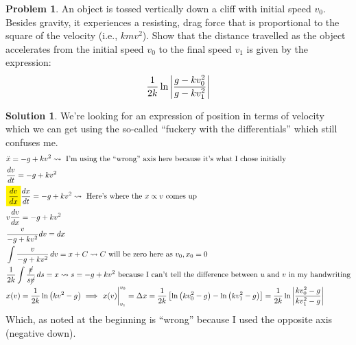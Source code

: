 \documentclass[10pt]{article}
\theoremstyle{definition}
\newtheorem{problem}{Problem}
\newtheorem{soln}{Solution}
\newcommand{\highlight}[1]{\colorbox{yellow}{$\displaystyle #1$}}
\begin{document}
\begin{problem}
An object is tossed vertically down a cliff with initial speed $v_0$. Besides gravity, it experiences a resisting, drag
force that is proportional to the square of the velocity (i.e., $kmv^2$). Show that the distance travelled as the object
accelerates from the initial speed $v_0$ to the final speed $v_1$ is given by the expression:
$$\frac{1}{2k}\ln\abs{\frac{g-kv_0^2}{g-kv_1^2}}$$
\end{problem}
\begin{soln} We're looking for an expression of position in terms of velocity which we can get using the so-called ``fuckery with the differentials'' which still confuses me.
     \begin{align*}
           & \ddot{x} = -g+kv^2 \rightsquigarrow \text{ I'm using the ``wrong'' axis here because it's what I chose initially}                                                                                           \\
           & \frac{dv}{dt} = -g+kv^2                                                                                                                                                                                     \\
           & \highlight{\frac{dv}{dx}}\frac{dx}{dt} = -g+kv^2 \rightsquigarrow \text{ Here's where the } x\propto v \text{ comes up}                                                                                     \\
           & v\frac{dv}{dx} = -g+kv^2                                                                                                                                                                                    \\
           & \frac{v}{-g+kv^2}dv = dx                                                                                                                                                                                    \\
           & \int \frac{v}{-g+kv^2} \,dv = x + C \rightsquigarrow C \text{ will be zero here as } v_0, x_0 = 0                                                                                                           \\
           & \frac{1}{2k}\int \frac{\cancel{v}}{s\cancel{v}} \,ds = x \rightsquigarrow s=-g+kv^2 \text{ because I can't tell the difference between $u$ and $v$ in my handwriting}                                       \\
           & x(v)=\frac{1}{2k}\ln\left(kv^2-g\right) \implies \eval{x(v)}_{v_1}^{v_0}=\Delta x=\frac{1}{2k}\left[\ln\left(kv_0^2-g\right)-\ln\left(kv_1^2-g\right)\right]=\frac{1}{2k}\ln\abs{\frac{kv_0^2-g}{kv_1^2-g}} \\
     \end{align*}
     Which, as noted at the beginning is ``wrong'' because I used the opposite axis (negative down).
\end{soln}
\end{document}
